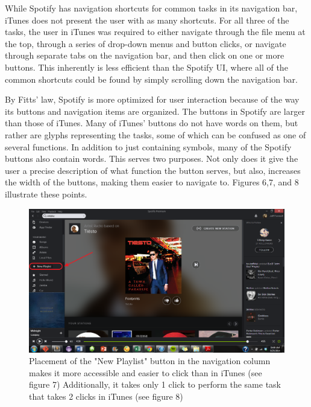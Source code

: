 \documentclass[12pt]{article}
\begin{document}
While Spotify has navigation shortcuts for common tasks in its 
navigation bar, iTunes does not present the user with as many 
shortcuts. For all three of the tasks, the user in iTunes was 
required to either navigate through the file menu at the top, 
through a series of drop-down menus and button clicks, or navigate 
through separate tabs on the navigation bar, and then click on one 
or more buttons. This inherently is less efficient than the 
Spotify UI, where all of the common shortcuts could be found by 
simply scrolling down the navigation bar. 

By Fitts' law, Spotify is more optimized for user interaction 
because of the way its buttons and navigation items are organized. 
The buttons in Spotify are larger than those of iTunes. Many of 
iTunes' buttons do not have words on them, but rather are glyphs 
representing the tasks, some of which can be confused as one of 
several functions. In addition to just containing symbols, many of 
the Spotify buttons also contain words. This serves two purposes. 
Not only does it give the user a precise description of what 
function the button serves, but also, increases the width of the 
buttons, making them easier to navigate to. Figures 6,7, and 8 
illustrate these points.

\begin{figure}[H]
	\centering
	\includegraphics[width=.75\textwidth]{chart8.png}
	\caption{Placement of the "New Playlist" button in the 
navigation column makes it more accessible and easier to click 
than in iTunes (see figure 7) Additionally, it takes only 1 click 
to perform the same task that takes 2 clicks in iTunes (see figure 
8)}
\end{figure}
\end{document}
